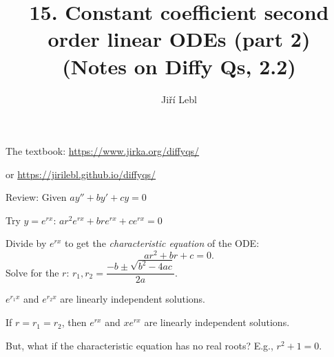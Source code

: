 \documentclass[10pt,aspectratio=169]{beamer}
\author{Ji\v{r}\'i Lebl}
\institute[OSU]{%
Oklahoma State University%
}
\title{15. Constant coefficient second order linear ODEs (part 2)\\(Notes on Diffy Qs, 2.2)}
\date{}
\begin{document}
\begin{frame}
\titlepage


\begin{center}
The textbook: \url{https://www.jirka.org/diffyqs/}

or \url{https://jirilebl.github.io/diffyqs/}
\end{center}
\end{frame}

\begin{frame}
Review: Given
\quad
$a y'' + b y' + c y = 0$

\medskip

Try $y = e^{rx}$:
\quad
$a r^2 e^{rx} + 
b r e^{rx} + 
c e^{rx} = 0$

\medskip
\pause
Divide by $e^{rx}$ to get the
\emph{characteristic equation} of the ODE:
\[
a r^2 + 
b r + 
c = 0 .
\]
\pause
Solve for the $r$:
\qquad 
$r_1, r_2 = \dfrac{-b \pm \sqrt{b^2 - 4ac}}{2a}$.

\medskip
\pause

\wthus $e^{r_1 x}$ and $e^{r_2 x}$ are linearly independent solutions.

\medskip
\pause

If $r=r_1=r_2$, then $e^{rx}$ and $xe^{rx}$ are linearly independent
solutions.

\medskip
\pause

But, what if the characteristic equation has no real roots?
E.g., $r^2+1=0$.
\end{frame}
\end{document}
